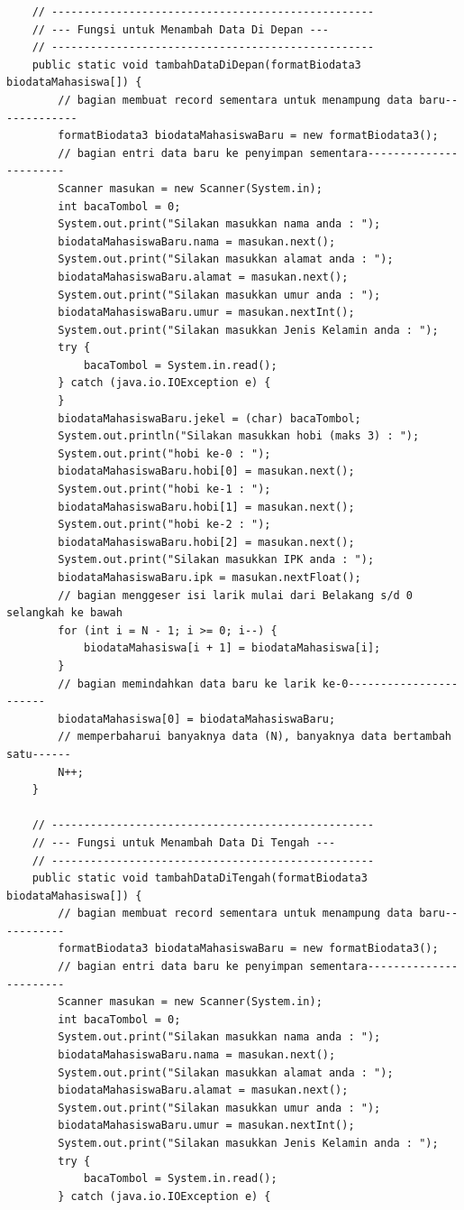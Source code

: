 \documentclass[a4paper,12pt]{article}
\begin{document}
\begin{lstlisting}
    // --------------------------------------------------
    // --- Fungsi untuk Menambah Data Di Depan ---
    // --------------------------------------------------
    public static void tambahDataDiDepan(formatBiodata3 biodataMahasiswa[]) {
        // bagian membuat record sementara untuk menampung data baru-------------
        formatBiodata3 biodataMahasiswaBaru = new formatBiodata3();
        // bagian entri data baru ke penyimpan sementara-----------------------
        Scanner masukan = new Scanner(System.in);
        int bacaTombol = 0;
        System.out.print("Silakan masukkan nama anda : ");
        biodataMahasiswaBaru.nama = masukan.next();
        System.out.print("Silakan masukkan alamat anda : ");
        biodataMahasiswaBaru.alamat = masukan.next();
        System.out.print("Silakan masukkan umur anda : ");
        biodataMahasiswaBaru.umur = masukan.nextInt();
        System.out.print("Silakan masukkan Jenis Kelamin anda : ");
        try {
            bacaTombol = System.in.read();
        } catch (java.io.IOException e) {
        }
        biodataMahasiswaBaru.jekel = (char) bacaTombol;
        System.out.println("Silakan masukkan hobi (maks 3) : ");
        System.out.print("hobi ke-0 : ");
        biodataMahasiswaBaru.hobi[0] = masukan.next();
        System.out.print("hobi ke-1 : ");
        biodataMahasiswaBaru.hobi[1] = masukan.next();
        System.out.print("hobi ke-2 : ");
        biodataMahasiswaBaru.hobi[2] = masukan.next();
        System.out.print("Silakan masukkan IPK anda : ");
        biodataMahasiswaBaru.ipk = masukan.nextFloat();
        // bagian menggeser isi larik mulai dari Belakang s/d 0 selangkah ke bawah
        for (int i = N - 1; i >= 0; i--) {
            biodataMahasiswa[i + 1] = biodataMahasiswa[i];
        }
        // bagian memindahkan data baru ke larik ke-0-----------------------
        biodataMahasiswa[0] = biodataMahasiswaBaru;
        // memperbaharui banyaknya data (N), banyaknya data bertambah satu------
        N++;
    }

    // --------------------------------------------------
    // --- Fungsi untuk Menambah Data Di Tengah ---
    // --------------------------------------------------
    public static void tambahDataDiTengah(formatBiodata3 biodataMahasiswa[]) {
        // bagian membuat record sementara untuk menampung data baru-----------
        formatBiodata3 biodataMahasiswaBaru = new formatBiodata3();
        // bagian entri data baru ke penyimpan sementara-----------------------
        Scanner masukan = new Scanner(System.in);
        int bacaTombol = 0;
        System.out.print("Silakan masukkan nama anda : ");
        biodataMahasiswaBaru.nama = masukan.next();
        System.out.print("Silakan masukkan alamat anda : ");
        biodataMahasiswaBaru.alamat = masukan.next();
        System.out.print("Silakan masukkan umur anda : ");
        biodataMahasiswaBaru.umur = masukan.nextInt();
        System.out.print("Silakan masukkan Jenis Kelamin anda : ");
        try {
            bacaTombol = System.in.read();
        } catch (java.io.IOException e) {


\end{lstlisting}
\end{document}
